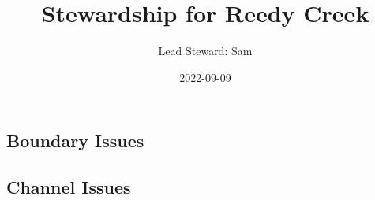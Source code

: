 \documentclass[
  landscape]{article}
\title{Stewardship for Reedy Creek}
\author{Lead Steward: Sam}
\date{2022-09-09}
\begin{document}
\maketitle

\hypertarget{boundary-issues}{%
\subsection{Boundary Issues}\label{boundary-issues}}

\textbar\textbar{} \textbar\textbar{} \textbar\textbar{}
\textbar\textbar{}

\hypertarget{channel-issues}{%
\subsection{Channel Issues}\label{channel-issues}}
\end{document}

